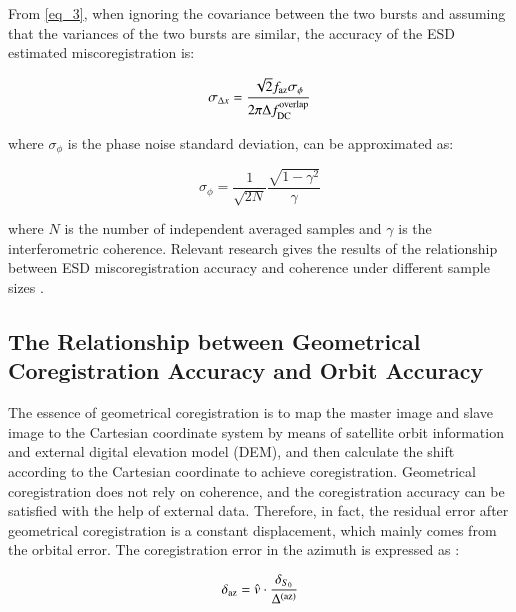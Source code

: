 \documentclass[preprint, authoryear]{elsarticle}
\begin{document}
From \ref{eq_3}, when ignoring the covariance between the two bursts and assuming that the variances of the two bursts are similar, the accuracy of the ESD estimated miscoregistration is: \par

\begin{equation}
    \sigma_{\Delta x} = \frac{\sqrt{2} f_{\rm az} \sigma_\phi}{2 \pi \Delta f_{\rm DC}^{\rm overlap}}
    \label{eq_6}
\end{equation}

\noindent where $\sigma_\phi$ is the phase noise standard deviation, can be approximated as: \par

\begin{equation}
    \sigma_{\phi} = \frac{1}{\sqrt{2N}} \frac{\sqrt{1 - \gamma^2}}{\gamma}
    \label{eq_7}
\end{equation}

\noindent where $N$ is the number of independent averaged samples and $\gamma$ is the interferometric coherence. Relevant research gives the results of the relationship between ESD miscoregistration accuracy and coherence under different sample sizes \cite{A_Network-Based_Enhanced_Spectral_Diversity_Approach_for_TOPS_Time-Series_Analysis}.

\subsection{The Relationship between Geometrical Coregistration Accuracy and Orbit Accuracy}
The essence of geometrical coregistration is to map the master image and slave image to the Cartesian coordinate system by means of satellite orbit information and external digital elevation model (DEM), and then calculate the shift according to the Cartesian coordinate to achieve coregistration. Geometrical coregistration does not rely on coherence, and the coregistration accuracy can be satisfied with the help of external data. Therefore, in fact, the residual error after geometrical coregistration is a constant displacement, which mainly comes from the orbital error. The coregistration error in the azimuth is expressed as \cite{Geometrical_SAR_image_registration}: \par

\begin{equation}
    \delta_{\rm az} = \hat{v} \cdot \frac{\delta_{S_0}}{\Delta^{({\rm az})}}
    \label{eq_8}
\end{equation}
\end{document}

